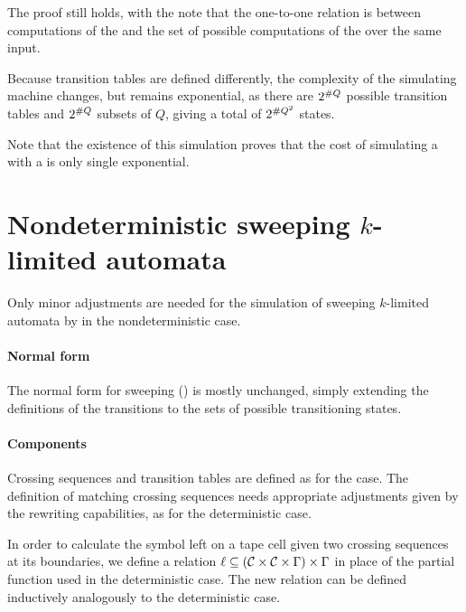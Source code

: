 The proof still holds, with the note that the one-to-one relation is between computations of the \ODFA and the set of possible computations of the \TNFA over the same input.

Because transition tables are defined differently, the complexity of the simulating machine changes, but remains exponential, as there are $2^{\# Q}$ possible transition tables and $2^{\# Q}$ subsets of $Q$, giving a total of $2^{\# Q^2}$ states.

Note that the existence of this simulation proves that the cost of simulating a \TNFA with a \ODFA is only single exponential.



\section[Nondeterministic sweeping \kLA]{Nondeterministic sweeping $k$-limited automata}\label{sec:nondet-sweeping}
Only minor adjustments are needed for the simulation of sweeping $k$-limited automata by \ONFA in the nondeterministic case.


\paragraph{Normal form} The normal form for sweeping \kLA () is mostly unchanged, simply extending the definitions of the transitions to the sets of possible transitioning states.

\paragraph{Components} Crossing sequences and transition tables are defined as for the \TNFA case. The definition of matching crossing sequences needs appropriate adjustments given by the rewriting capabilities, as for the deterministic case.

In order to calculate the symbol left on a tape cell given two crossing sequences at its boundaries, we define a relation $\ell\subseteq(\mathcal C\times\mathcal C\times\Gamma)\times\Gamma$ in place of the partial function used in the deterministic case.
The new relation can be defined inductively analogously to the deterministic case.

